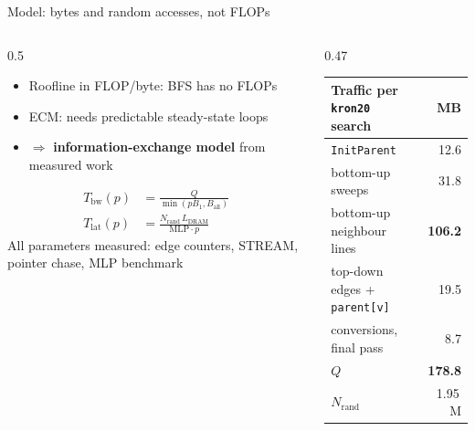 \documentclass[aspectratio=169,11pt]{beamer}
\begin{document}
\begin{frame}{Model: bytes and random accesses, not FLOPs}
  \begin{columns}[T]
    \begin{column}{0.5\textwidth}
      \small
      \begin{itemize}\setlength{\itemsep}{3pt}
        \item Roofline in FLOP/byte: BFS has no FLOPs
        \item ECM: needs predictable steady-state loops
        \item $\Rightarrow$ \textbf{information-exchange model} from measured work
      \end{itemize}
      \vspace*{-0.1cm}
      \begin{align*}
        T_\text{bw}(p) &= \frac{Q}{\min(p B_1, B_\text{all})}\\
        T_\text{lat}(p) &= \frac{N_\text{rand}\,L_\text{DRAM}}{\text{MLP}\cdot p}
      \end{align*}
      \footnotesize All parameters measured: edge counters, STREAM, pointer chase, MLP benchmark
    \end{column}
    \begin{column}{0.47\textwidth}
      \small
      \begin{tabular}{@{}lr@{}}
        \toprule
        Traffic per \texttt{kron20} search & MB \\
        \midrule
        \texttt{InitParent} & 12.6 \\
        bottom-up sweeps & 31.8 \\
        bottom-up neighbour lines & \textbf{106.2} \\
        top-down edges + \texttt{parent[v]} & 19.5 \\
        conversions, final pass & 8.7 \\
        \midrule
        $Q$ & \textbf{178.8} \\
        $N_\text{rand}$ & 1.95\,M \\
        \bottomrule
      \end{tabular}
    \end{column}
  \end{columns}
\end{frame}
\end{document}
